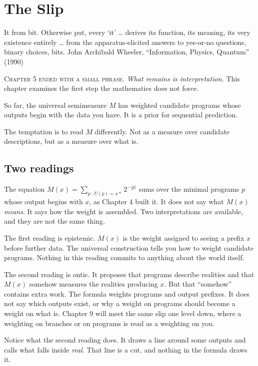 \chapter{The Slip}

\chapterepigraph
{It from bit. Otherwise put, every `it' \ldots{} derives its function, its meaning, its very existence entirely \ldots{} from the apparatus-elicited answers to yes-or-no questions, binary choices, bits.}
{John Archibald Wheeler, ``Information, Physics, Quantum'' (1990)}

\noindent \textsc{Chapter 5 ended with a small phrase.} \emph{What remains is interpretation.} This chapter examines the first step the mathematics does not force.

So far, the universal semimeasure $M$ has weighted candidate programs whose outputs begin with the data you have. It is a prior for sequential prediction.

The temptation is to read $M$ differently. Not as a measure over candidate descriptions, but as a measure over what is.

\section*{Two readings}

The equation $M(x) = \sum_{p\,:\,U(p) = x{*}} 2^{-|p|}$ sums over the minimal programs $p$ whose output begins with $x$, as Chapter 4 built it. It does not say what $M(x)$ \emph{means}. It says how the weight is assembled. Two interpretations are available, and they are not the same thing.

The first reading is epistemic. $M(x)$ is the weight assigned to seeing a prefix $x$ before further data. The universal construction tells you how to weight candidate programs. Nothing in this reading commits to anything about the world itself.

The second reading is ontic. It proposes that programs describe realities and that $M(x)$ somehow measures the realities producing $x$. But that ``somehow'' contains extra work. The formula weights programs and output prefixes. It does not say which outputs exist, or why a weight on programs should become a weight on what is. Chapter 9 will meet the same slip one level down, where a weighting on branches or on programs is read as a weighting on you.

Notice what the second reading does. It draws a line around some outputs and calls what falls inside \emph{real}. That line is a cut, and nothing in the formula draws it.

